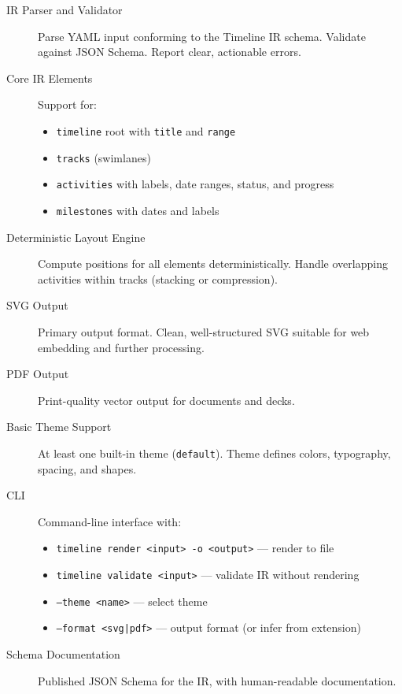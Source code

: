 \begin{description}
  \item[IR Parser and Validator] Parse YAML input conforming to the Timeline IR schema. Validate against JSON Schema. Report clear, actionable errors.
  
  \item[Core IR Elements] Support for:
  \begin{itemize}
    \item \texttt{timeline} root with \texttt{title} and \texttt{range}
    \item \texttt{tracks} (swimlanes)
    \item \texttt{activities} with labels, date ranges, status, and progress
    \item \texttt{milestones} with dates and labels
  \end{itemize}
  
  \item[Deterministic Layout Engine] Compute positions for all elements deterministically. Handle overlapping activities within tracks (stacking or compression).
  
  \item[SVG Output] Primary output format. Clean, well-structured SVG suitable for web embedding and further processing.
  
  \item[PDF Output] Print-quality vector output for documents and decks.
  
  \item[Basic Theme Support] At least one built-in theme (\texttt{default}). Theme defines colors, typography, spacing, and shapes.
  
  \item[CLI] Command-line interface with:
  \begin{itemize}
    \item \texttt{timeline render <input> -o <output>} — render to file
    \item \texttt{timeline validate <input>} — validate IR without rendering
    \item \texttt{--theme <name>} — select theme
    \item \texttt{--format <svg|pdf>} — output format (or infer from extension)
  \end{itemize}
  
  \item[Schema Documentation] Published JSON Schema for the IR, with human-readable documentation.
\end{description}

